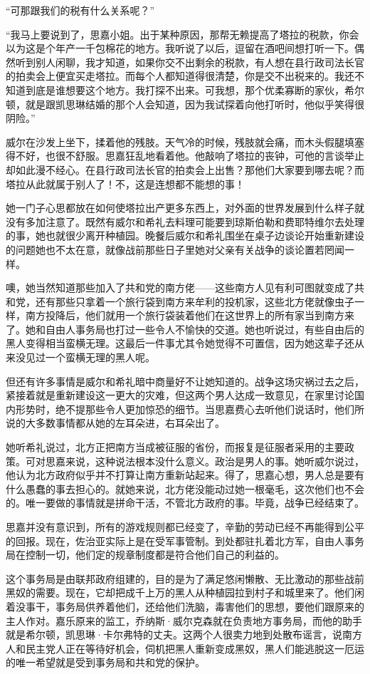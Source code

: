 \par “可那跟我们的税有什么关系呢？”
\par “我马上要说到了，思嘉小姐。出于某种原因，那帮无赖提高了塔拉的税款，你会以为这是个年产一千包棉花的地方。我听说了以后，逗留在酒吧间想打听一下。偶然听到别人闲聊，我才知道，如果你交不出剩余的税款，有人想在县行政司法长官的拍卖会上便宜买走塔拉。而每个人都知道得很清楚，你是交不出税来的。我还不知道到底是谁想要这个地方。我打探不出来。可我想，那个优柔寡断的家伙，希尔顿，就是跟凯思琳结婚的那个人会知道，因为我试探着向他打听时，他似乎笑得很阴险。”
\par 威尔在沙发上坐下，揉着他的残肢。天气冷的时候，残肢就会痛，而木头假腿填塞得不好，也很不舒服。思嘉狂乱地看着他。他敲响了塔拉的丧钟，可他的言谈举止却如此漫不经心。在县行政司法长官的拍卖会上出售？那他们大家要到哪去呢？而塔拉从此就属于别人了！不，这是连想都不能想的事！
\par 她一门子心思都放在如何使塔拉出产更多东西上，对外面的世界发展到什么样子就没有多加注意了。既然有威尔和希礼去料理可能要到琼斯伯勒和费耶特维尔去处理的事，她也就很少离开种植园。晚餐后威尔和希礼围坐在桌子边谈论开始重新建设的问题她也不太在意，就像战前那些日子里她对父亲有关战争的谈论置若罔闻一样。
\par 噢，她当然知道那些加入了共和党的南方佬——这些南方人见有利可图就变成了共和党，还有那些只拿着一个旅行袋到南方来牟利的投机家，这些北方佬就像虫子一样，南方投降后，他们就用一个旅行袋装着他们在这世界上的所有家当到南方来了。她和自由人事务局也打过一些令人不愉快的交道。她也听说过，有些自由后的黑人变得相当蛮横无理。这最后一件事尤其令她觉得不可置信，因为她这辈子还从来没见过一个蛮横无理的黑人呢。
\par 但还有许多事情是威尔和希礼暗中商量好不让她知道的。战争这场灾祸过去之后，紧接着就是重新建设这一更大的灾难，但这两个男人达成一致意见，在家里讨论国内形势时，绝不提那些令人更加惊恐的细节。当思嘉费心去听他们说话时，他们所说的大多数事情都从她的左耳朵进，右耳朵出了。
\par 她听希礼说过，北方正把南方当成被征服的省份，而报复是征服者采用的主要政策。可对思嘉来说，这种说法根本没什么意义。政治是男人的事。她听威尔说过，他认为北方政府似乎并不打算让南方重新站起来。得了，思嘉心想，男人总是要有什么愚蠢的事去担心的。就她来说，北方佬没能动过她一根毫毛，这次他们也不会的。唯一要做的事情就是拼命干活，不管北方政府的事。毕竟，战争已经结束了。
\par 思嘉并没有意识到，所有的游戏规则都已经变了，辛勤的劳动已经不再能得到公平的回报。现在，佐治亚实际上是在受军事管制。到处都驻扎着北方军，自由人事务局在控制一切，他们定的规章制度都是符合他们自己的利益的。
\par 这个事务局是由联邦政府组建的，目的是为了满足悠闲懒散、无比激动的那些战前黑奴的需要。现在，它却把成千上万的黑人从种植园拉到村子和城里来了。他们闲着没事干，事务局供养着他们，还给他们洗脑，毒害他们的思想，要他们跟原来的主人作对。嘉乐原来的监工，乔纳斯·威尔克森就在负责地方事务局，而他的助手就是希尔顿，凯思琳·卡尔弗特的丈夫。这两个人很卖力地到处散布谣言，说南方人和民主党人正在等待好机会，伺机把黑人重新变成黑奴，黑人们能逃脱这一厄运的唯一希望就是受到事务局和共和党的保护。
